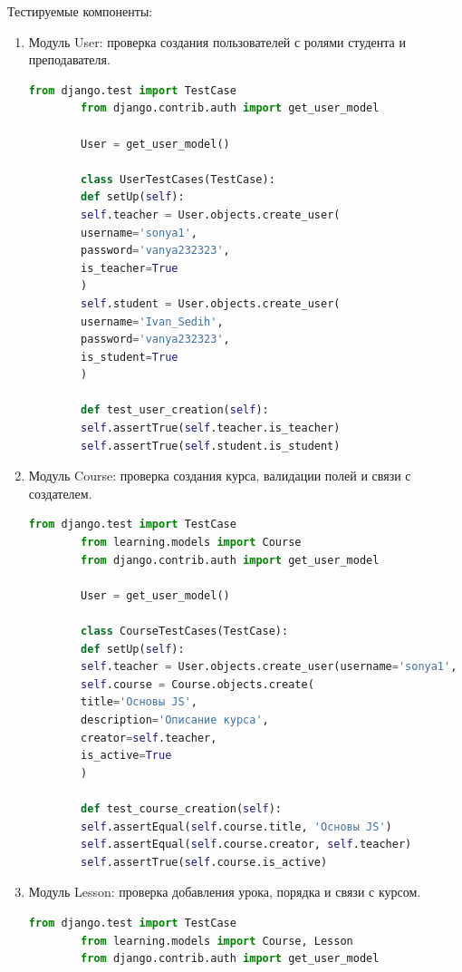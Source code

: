Тестируемые компоненты:
\begin{enumerate}
	\item Модуль User: проверка создания пользователей с ролями студента и преподавателя.
	\begin{lstlisting}[language=Python, caption=Модульный тест для User, label=lst:user_test]
		from django.test import TestCase
		from django.contrib.auth import get_user_model
		
		User = get_user_model()
		
		class UserTestCases(TestCase):
		def setUp(self):
		self.teacher = User.objects.create_user(
		username='sonya1',
		password='vanya232323',
		is_teacher=True
		)
		self.student = User.objects.create_user(
		username='Ivan_Sedih',
		password='vanya232323',
		is_student=True
		)
		
		def test_user_creation(self):
		self.assertTrue(self.teacher.is_teacher)
		self.assertTrue(self.student.is_student)
	\end{lstlisting}
	
	\item Модуль Course: проверка создания курса, валидации полей и связи с создателем.
	\begin{lstlisting}[language=Python, caption=Модульный тест для Course, label=lst:course_test]
		from django.test import TestCase
		from learning.models import Course
		from django.contrib.auth import get_user_model
		
		User = get_user_model()
		
		class CourseTestCases(TestCase):
		def setUp(self):
		self.teacher = User.objects.create_user(username='sonya1', password='vanya232323', is_teacher=True)
		self.course = Course.objects.create(
		title='Основы JS',
		description='Описание курса',
		creator=self.teacher,
		is_active=True
		)
		
		def test_course_creation(self):
		self.assertEqual(self.course.title, 'Основы JS')
		self.assertEqual(self.course.creator, self.teacher)
		self.assertTrue(self.course.is_active)
	\end{lstlisting}
	
	\item Модуль Lesson: проверка добавления урока, порядка и связи с курсом.
	\begin{lstlisting}[language=Python, caption=Модульный тест для Lesson, label=lst:lesson_test]
		from django.test import TestCase
		from learning.models import Course, Lesson
		from django.contrib.auth import get_user_model
		

\end{lstlisting}
\end{enumerate}
